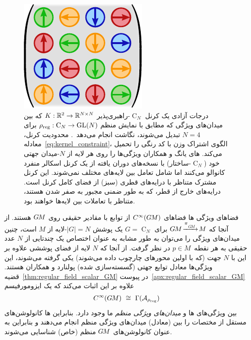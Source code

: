 \begin{figure}
    \hspace*{-2ex}
    \includegraphics[width=.24\columnwidth]{figures/regular_C4_kernel.pdf}
    \captionsetup{width=1.1\columnwidth}
    \hspace{2ex}
    \caption{\small
        درجات آزادی یک کرنل $\operatorname{C}_N$-راهبری‌پذیر ${K: \mathbb{R}^2 \to \mathbb{R}^{N\times N}}$ که بین میدان‌های ویژگی که مطابق با نمایش منظم ${\rho_{\textup{reg}}: \operatorname{C}_N \to \operatorname{GL}(N)}$ برای $N=4$ تبدیل می‌شوند، نگاشت انجام می‌دهد~\cite{Weiler2019_E2CNN}.
        محدودیت کرنل، معادله~\eqref{eq:kernel_constraint}، الگوی اشتراک وزن با کد رنگی را تحمیل می‌کند.
        های یانگ و همکاران\cite{Yang2020parallelFrameCNN} ویژگی‌ها را روی هر لایه از $N$-میدان جهتی خود ($\operatorname{C}_N$-ساختار) با نسخه‌های دوران یافته از یک کرنل اسکالر منفرد کانوالو می‌کنند اما شامل تعامل بین لایه‌های مختلف نمی‌شوند.
        این کرنل مشترک متناظر با درایه‌های قطری (سبز) از فضای کامل کرنل است.
        درایه‌های خارج از قطر، که به طور ضمنی مجبور به صفر شدن هستند، متناظر با تعاملات بین لایه‌ها خواهند بود.
    }
    \label{fig:regular_C4_kernel}
\end{figure}

فضاهای ویژگی ها فضاهای $C^\infty(G\mkern-1.4muM)$ از توابع با مقادیر حقیقی روی $G\mkern-1.4muM$ هستند.
از آنجا که $\GM\!\xrightarrow{\piGM}\!M$ برای $G=\operatorname{C}_N$ یک پوشش $|G| = N$-لایه از $M$ است، چنین میدان‌های ویژگی را می‌توان به طور مشابه به عنوان اختصاص یک چندتایی از $N$ عدد حقیقی به هر نقطه~$p\in M$ در نظر گرفت.
از آنجا که $N$ لایه از فضای پوششی علاوه بر این با $N$ جهت (که با اولین محورهای چارچوب داده می‌شوند) یکی گرفته می‌شوند، این ویژگی‌ها معادل توابع جهتی (گسسته‌سازی شده) پولنارد و همکاران\cite{poulenard2018multi} هستند.
قضیه~\ref{thm:regular_field_scalar_GM} در پیوست~\ref{apx:regular_field_scalar_GM} علاوه بر این اثبات می‌کند که یک ایزومورفیسم
\begin{align}
    C^\infty(G\mkern-1.4muM)\ \cong\ \Gamma(\mathcal{A}_{\rho_\textup{reg}})
\end{align}
بین ویژگی‌های ها و \emph{میدان‌های ویژگی منظم} ما وجود دارد.
بنابراین ها کانولوشن‌های مستقل از مختصات را بین (معادل) میدان‌های ویژگی منظم انجام می‌دهند و بنابراین به عنوان کانولوشن‌های $G\mkern-1.4muM$ منظم (خاص) شناسایی می‌شوند.

